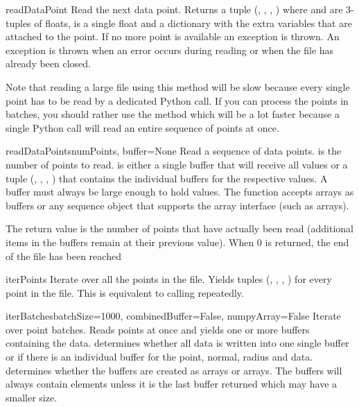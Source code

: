 \begin{methoddesc}{readDataPoint}{}
Read the next data point. Returns a tuple (, ,
, ) where  and  are 3-tuples of
floats,  is a single float and  a dictionary with the
extra variables that are attached to the point. If no more point is available
an  exception is thrown.
An  exception is thrown when an error occurs during reading
or when the file has already been closed.

Note that reading a large file using this method will be slow because every
single point has to be read by a dedicated Python call. If you can process
the points in batches, you should rather use the 
method which will be a lot faster because a single Python call will read
an entire sequence of points at once.
\end{methoddesc}

\begin{methoddesc}{readDataPoints}{numPoints, buffer=None}
Read a sequence of data points.
 is the number of points to read.  is either a single
buffer that will receive all values or a tuple (, ,
, ) that contains the individual buffers for the
respective values. A buffer must always be large enough to hold 
values. The function accepts  arrays as buffers or any sequence
object that supports the array interface (such as  arrays).
        
The return value is the number of points that have actually been read (additional
items in the buffers remain at their previous value). When 0 is returned, the
end of the file has been reached
\end{methoddesc}

\begin{methoddesc}{iterPoints}{}
Iterate over all the points in the file.
Yields tuples (, , , ) for every
point in the file. This is equivalent to calling 
repeatedly.
\end{methoddesc}

\begin{methoddesc}{iterBatches}{batchSize=1000, combinedBuffer=False,
numpyArray=False}
Iterate over point batches.
Reads  points at once and yields one or more buffers containing
the data.  determines whether all data is written into one
single buffer or if there is an individual buffer for the point, normal, radius
and data.  determines whether the buffers are created as
 arrays or  arrays. The buffers will always contain
 elements unless it is the last buffer returned which may
have a smaller size.
\end{methoddesc}


